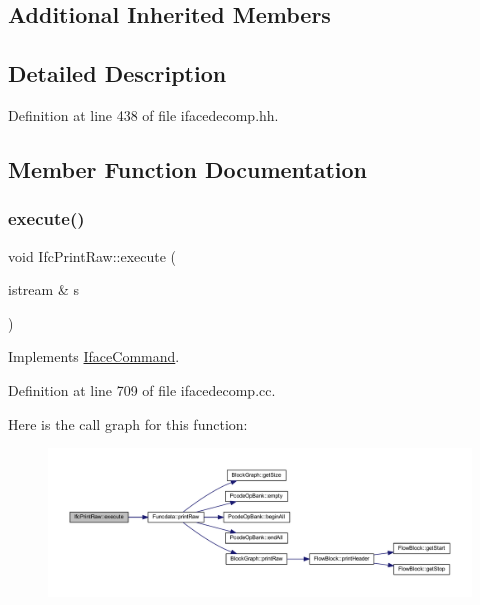 \subsection*{Additional Inherited Members}


\subsection{Detailed Description}


Definition at line 438 of file ifacedecomp.\+hh.



\subsection{Member Function Documentation}
\mbox{\label{class_ifc_print_raw_a9aecf31758a44ef1e025eb867e267529}} 
\subsubsection{\texorpdfstring{execute()}{execute()}}
{\footnotesize\ttfamily void Ifc\+Print\+Raw\+::execute (\begin{DoxyParamCaption}\item[{istream \&}]{s }\end{DoxyParamCaption})\hspace{0.3cm}{\ttfamily [virtual]}}



Implements \mbox{\hyperlink{class_iface_command_af10e29cee2c8e419de6efe9e680ad201}{Iface\+Command}}.



Definition at line 709 of file ifacedecomp.\+cc.

Here is the call graph for this function\+:
\nopagebreak
\begin{figure}[H]
\begin{center}
\leavevmode
\includegraphics[width=350pt]{class_ifc_print_raw_a9aecf31758a44ef1e025eb867e267529_cgraph}
\end{center}
\end{figure}


